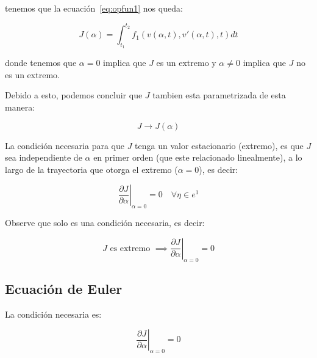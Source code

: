         tenemos que la ecuación~\ref{eq:opfun1} nos queda:

        \begin{equation*}
            J(\alpha) = \int_{t_1}^{t_2} f_1(v(\alpha, t), v'(\alpha, t), t) dt
        \end{equation*}

        donde tenemos que $\alpha = 0$ implica que $J$ es un extremo y $\alpha \ne 0$ implica que $J$ no es un extremo.

        Debido a esto, podemos concluir que $J$ tambien esta parametrizada de esta manera:

        \begin{equation*}
            J \to J(\alpha)
        \end{equation*}

        La condición necesaria para que $J$ tenga un valor estacionario (extremo), es que $J$ sea independiente de $\alpha$ en primer orden (que este relacionado linealmente), a lo largo de la trayectoria que otorga el extremo ($\alpha = 0$), es decir:

        \begin{equation}
            \left. \frac{\partial J}{\partial \alpha} \right|_{\alpha=0} = 0 \quad \forall \eta \in e^1
        \end{equation}

        \begin{nota}
            Observe que solo es una condición necesaria, es decir:

            \begin{equation*}
                J \text{ es extremo } \implies \left. \frac{\partial J}{\partial \alpha} \right|_{\alpha=0} = 0
            \end{equation*}
        \end{nota}


        \subsection{Ecuación de Euler}

            La condición necesaria es:

            \begin{equation*}
                \left. \frac{\partial J}{\partial \alpha} \right|_{\alpha=0} = 0
            \end{equation*}

